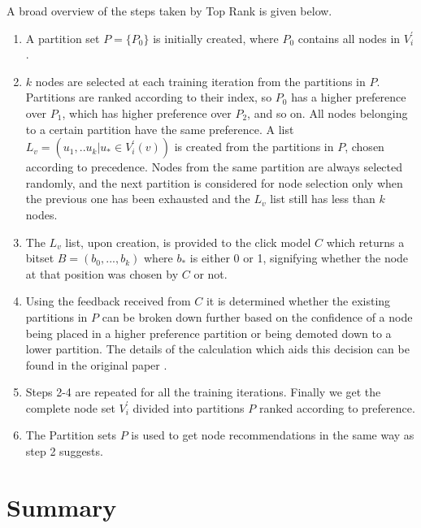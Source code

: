 A broad overview of the steps taken by Top Rank is given below. 

\begin{enumerate}
	\item A partition set $P=\{P_{0}\}$ is initially created, where $P_{0}$ contains all nodes in $V^{\prime}_{i}$. 
	
	\item $k$ nodes are selected at each training iteration from the partitions in $P$. Partitions are ranked according to their index, so $P_{0}$ has a higher preference over $P_{1}$, which has higher preference over $P_{2}$, and so on. All nodes belonging to a certain partition have the same preference. A list $L_{v}=(u_{1},..u_{k} | u_{*} \in V^{\prime}_{i}(v))$ is created from the partitions in $P$, chosen according to precedence. Nodes from the same partition are always selected randomly, and the next partition is considered for node selection only when the previous one has been exhausted and the $L_{v}$ list still has less than $k$ nodes. 
	
	\item The $L_{v}$ list, upon creation, is provided to the click model $C$ which returns a bitset $B=(b_{0},...,b_{k})$ where $b_{*}$ is either 0 or 1, signifying whether the node at that position was chosen by $C$ or not.
	
	\item Using the feedback received from $C$ it is determined whether the existing partitions in $P$ can be broken down further based on the confidence of a node being placed in a higher preference partition or being demoted down to a lower partition. The details of the calculation which aids this decision can be found in the original paper \cite{lattimore2018toprank}.
	
	\item Steps 2-4 are repeated for all the training iterations. Finally we get the complete node set $V^{\prime}_{i}$ divided into partitions $P$ ranked according to preference.
	
	\item The Partition sets $P$ is used to get node recommendations in the same way as step 2 suggests.
	
\end{enumerate}

\section{Summary}

